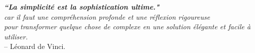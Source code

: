 \newpage
\thispagestyle{empty} \vspace*{\fill}
\begin{flushright}
    \textit{\textbf{“La simplicité est la sophistication ultime."} } \\
    \textit{car il faut une compréhension profonde et une réflexion rigoureuse} \\
    \textit{pour transformer quelque chose de complexe en une solution élégante et facile à utiliser.} \\ \vspace{0.25cm}
    -- Léonard de Vinci.
\end{flushright}
\vspace*{\fill}
\newpage
